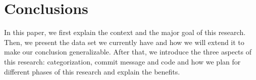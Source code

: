 \section{Conclusions}
\label{sec:conclusion}

In this paper, we first explain the context and the major goal of this research.
Then, we present the data set we currently have and how we will extend it to make our conclusion generalizable.
After that, we introduce the three aspects of this research: categorization, commit message and code and how we plan for different phases of this research and explain the benefits.